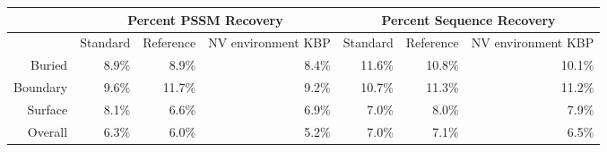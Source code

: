
\begin{tabular}{|r|r|r|r|r|r|r|}
\hline
 & \multicolumn{3}{c}{Percent PSSM Recovery} & \multicolumn{3}{|c|}{Percent Sequence Recovery}\\
\hline
  & Standard & Reference & NV environment KBP & Standard & Reference & NV environment KBP \\
\hline
Buried & 8.9\% & 8.9\% & 8.4\% & 11.6\% & 10.8\% & 10.1\%\\
\hline
Boundary & 9.6\% & 11.7\% & 9.2\% & 10.7\% & 11.3\% & 11.2\%\\
\hline
Surface & 8.1\% & 6.6\% & 6.9\% & 7.0\% & 8.0\% & 7.9\%\\
\hline
Overall & 6.3\% & 6.0\% & 5.2\% & 7.0\% & 7.1\% & 6.5\%\\
\hline
\end{tabular}
